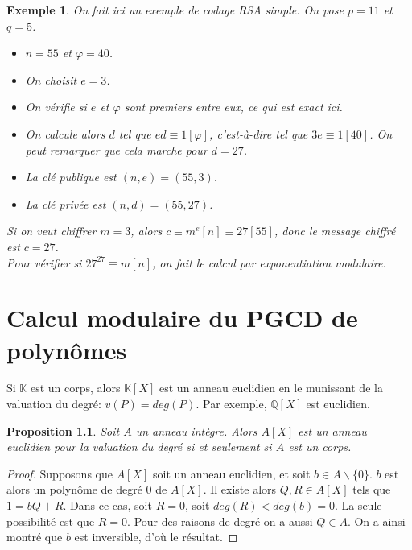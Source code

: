 \documentclass[10pt,a4paper]{report}
\newtheorem*{rap}{Rappels}
\newtheorem*{ex}{Exemple}
\newtheorem{Prop}[thm]{Proposition}
\begin{document}
\begin{ex}
On fait ici un exemple de codage RSA simple. On pose $p=11$ et $q=5$.
\begin{itemize}
\item[$1.$] $n=55$ et $\varphi=40$.
\item[$2.$] On choisit $e=3$.
\item[$3.$] On vérifie si $e$ et $\varphi$ sont premiers entre eux, ce qui est exact ici.
\item[$4.$] On calcule alors $d$ tel que $ed \equiv 1 [\varphi]$, c'est-à-dire tel que $3e \equiv 1[40]$. On peut remarquer que cela marche pour $d=27$.
\item[$5.$] La clé publique est $(n,e)=(55,3)$.
\item[$6.$] La clé privée est $(n,d)=(55,27)$. 
\end{itemize}
Si on veut chiffrer $m=3$, alors $c \equiv m^e[n] \equiv 27 [55]$, donc le message chiffré est $c=27$.\\
Pour vérifier si $27^{27} \equiv m [n]$, on fait le calcul par exponentiation modulaire.
\end{ex}




\chapter{Calcul modulaire du PGCD de polynômes}


Si $\mathbb{K}$ est un corps, alors $\mathbb{K}[X]$ est un anneau euclidien en le munissant de la valuation du degré: $v(P)=deg(P)$. Par exemple, $\mathbb{Q}[X]$ est euclidien.

\begin{Prop}
Soit $A$ un anneau intègre. Alors $A[X]$ est un anneau euclidien pour la valuation du degré si et seulement si $A$ est un corps.
\end{Prop}

\begin{proof}
Supposons que $A[X]$ soit un anneau euclidien, et soit $b \in A \smallsetminus \{  0 \}$. $b$ est alors un polynôme de degré 0 de $A [X]$. Il existe alors $Q,R \in A[X]$ tels que $1=bQ+R$. Dans ce cas, soit $R=0$, soit $deg(R)<deg(b)=0$. La seule possibilité est que $R=0$. Pour des raisons de degré on a aussi $Q\in A$. On a ainsi montré que $b$ est inversible, d'où le résultat.
\end{proof}
\end{document}
